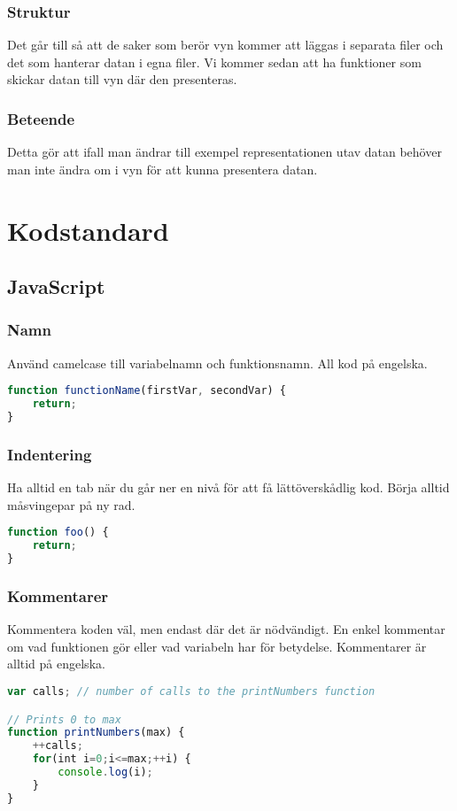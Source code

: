 \documentclass[a4paper, 12pt, titlepage]{article}
\begin{document}
        \subsubsection{Struktur}
            Det går till så att de saker som berör vyn kommer att läggas i separata filer och det som hanterar datan i egna filer. Vi kommer sedan att ha funktioner som skickar datan till vyn där den presenteras.
        
        \subsubsection{Beteende}
            Detta gör att ifall man ändrar till exempel representationen utav datan behöver man inte ändra om i vyn för att kunna presentera datan.
    \section{Kodstandard}
        \subsection{JavaScript}
            \subsubsection{Namn}
            Använd camelcase till variabelnamn och funktionsnamn. All kod på engelska.
            
            \begin{lstlisting}[language=JavaScript]
function functionName(firstVar, secondVar) {
    return;
}
            \end{lstlisting}
        
            \subsubsection{Indentering}
            Ha alltid en tab när du går ner en nivå för att få lättöverskådlig kod. Börja alltid måsvingepar på ny rad.
            
            \begin{lstlisting}[language=JavaScript]
function foo() {
    return;
}           
            \end{lstlisting}
            
            \subsubsection{Kommentarer}
            Kommentera koden väl, men endast där det är nödvändigt. En enkel kommentar om vad funktionen gör eller vad variabeln har för betydelse. Kommentarer är alltid på engelska.
\begin{lstlisting}[language=JavaScript]
var calls; // number of calls to the printNumbers function

// Prints 0 to max
function printNumbers(max) {
    ++calls;
    for(int i=0;i<=max;++i) {
        console.log(i);
    }
}
\end{lstlisting}            
        
\end{document}
